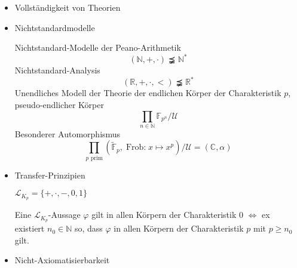 \documentclass[12pt,parskip=full]{scrartcl}
\newcommand{\setN}{\mathbb{N}}
\newcommand{\setR}{\mathbb{R}}
\newcommand{\setC}{\mathbb{C}}
\theoremstyle{definition}
\begin{document}
	\begin{itemize}
		\item Vollständigkeit von Theorien
		\item Nichtstandardmodelle
		
		Nichtstandard-Modelle der Peano-Arithmetik
		\begin{equation*}
			(\setN, +, \cdot) \precneqq \setN^*
		\end{equation*}
		Nichtstandard-Analysis
		\begin{equation*}
			(\setR, +, \cdot, <) \precneqq \setR^*
		\end{equation*}
		Unendliches Modell der Theorie der endlichen Körper der Charakteristik $p$, pseudo-endlicher Körper
		\begin{equation*}
			\prod_{n \in \setN} \mathbb{F}_{p^n} / \mathcal{U}
		\end{equation*}
		Besonderer Automorphismus
		\begin{equation*}
			\prod_{p \text{ prim}} (\tilde{\mathbb{F}}_p, \operatorname{Frob:} x \mapsto x^p) / \mathcal{U} = (\setC, \alpha)
		\end{equation*}
		
		\item Transfer-Prinzipien
		
		$\mathcal{L}_{K_p} = \{ +, \cdot, -, 0, 1 \}$
		
		Eine $\mathcal{L}_{K_p}$-Aussage $\varphi$ gilt in allen Körpern der Charakteristik $0$ $\Leftrightarrow$ ex existiert $n_0 \in \setN$ so, dass $\varphi$ in allen Körpern der Charakteristik $p$ mit $p \geq n_0$ gilt.
		
		\item Nicht-Axiomatisierbarkeit
	\end{itemize}
\end{document}
